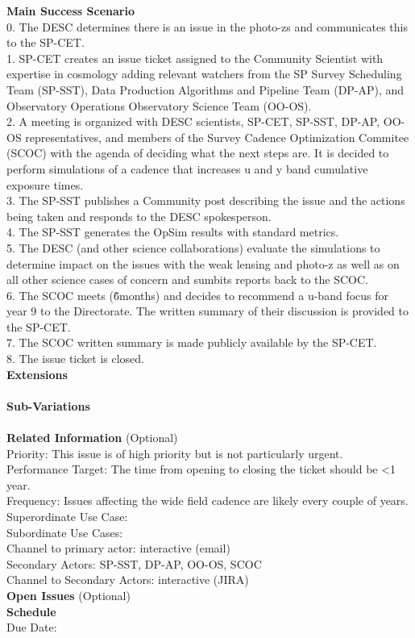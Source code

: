 {\bf Main Success Scenario} \\
0. The DESC determines there is an issue in the photo-zs and communicates this to the SP-CET. \\
1. SP-CET creates an issue ticket assigned to the Community Scientist with expertise in cosmology adding relevant watchers from the SP Survey Scheduling Team (SP-SST), Data Production Algorithms and Pipeline Team (DP-AP), and Observatory Operations Observatory Science Team (OO-OS). \\
2. A meeting is organized with DESC scientists, SP-CET, SP-SST, DP-AP, OO-OS representatives, and members of the Survey Cadence Optimization Commitee (SCOC) with the agenda of deciding what the next steps are. It is decided to perform simulations of a cadence that increases u and y band cumulative exposure times. \\
3. The SP-SST publishes a Community post describing the issue and the actions being taken and responds to the DESC spokesperson. \\
4. The SP-SST generates the OpSim results with standard metrics. \\ 
5. The DESC (and other science collaborations) evaluate the simulations to determine impact on the issues with the weak lensing and photo-z as well as on all other science cases of concern and sumbits reports back to the SCOC. \\
6. The SCOC meets (\~ 6months) and decides to recommend a u-band focus for year 9 to the Directorate. The written summary of their discussion is provided to the SP-CET. \\
7. The SCOC written summary is made publicly available by the SP-CET. \\
8. The issue ticket is closed. \\


{\bf Extensions} \\
\\

{\bf Sub-Variations} \\
\\

{\bf Related Information} (Optional) \\
Priority: This issue is of high priority but is not particularly urgent. \\
Performance Target: The time from opening to closing the ticket should be <1 year. \\
Frequency: Issues affecting the wide field cadence are likely every couple of years. \\
Superordinate Use Case:  \\
Subordinate Use Cases: \\
Channel to primary actor: interactive (email) \\
Secondary Actors: SP-SST, DP-AP, OO-OS, SCOC \\
Channel to Secondary Actors: interactive (JIRA) \\

{\bf Open Issues} (Optional) \\

{\bf Schedule} \\
Due Date: \\
